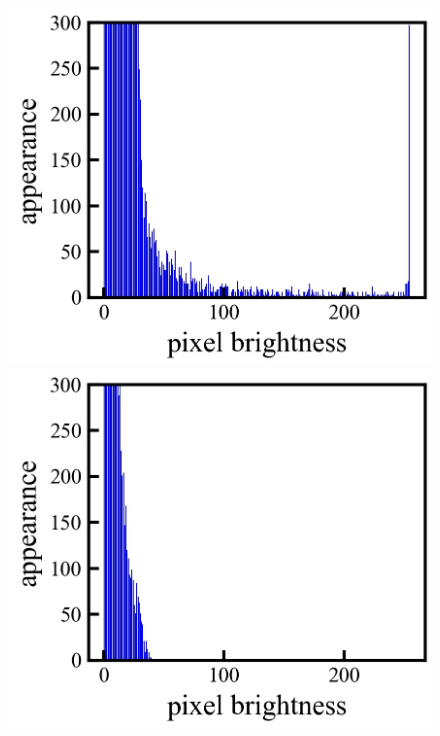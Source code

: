 \begin{figure}[h]
	\begin{center}
		\begin{minipage}{0.3\linewidth}
			\includegraphics[width=0.98\columnwidth]{./theory/figure/5/hist_0.jpg}
		\end{minipage}
		\begin{minipage}{0.3\linewidth}
			\includegraphics[width=0.98\columnwidth]{./theory/figure/5/hist_1.jpg}
		\end{minipage}
		\begin{minipage}{0.3\linewidth}

\end{minipage}
\end{center}
\end{figure}
